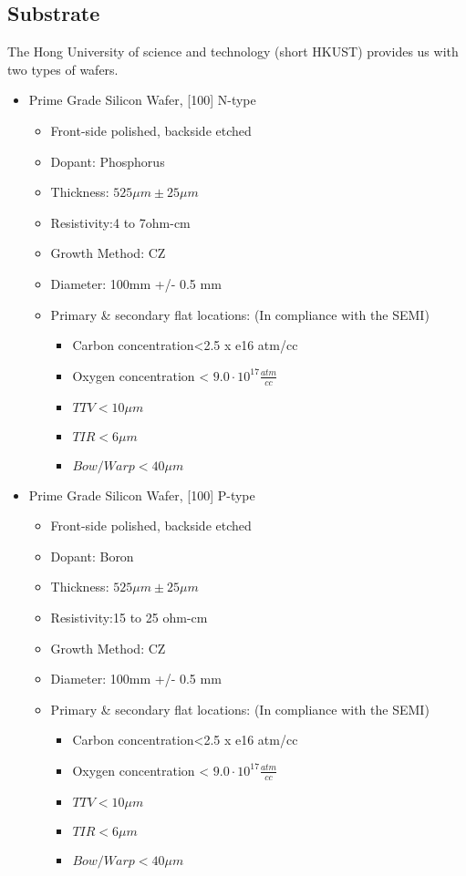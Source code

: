 \subsection{Substrate}

The Hong University of science and technology (short HKUST) provides us with two types of wafers.

\begin{itemize}
	\item Prime Grade Silicon Wafer, [100] N-type
	\begin{itemize}
		\item Front-side polished, backside etched
		\item Dopant: Phosphorus
		\item Thickness: $525 \mu m \pm 25 \mu m$
		\item Resistivity:4 to 7ohm-cm
		\item Growth Method: CZ
		\item Diameter: 100mm +/- 0.5 mm
		\item Primary  \& secondary flat locations: (In compliance with the SEMI)
			\begin{itemize}
				\item Carbon concentration<2.5 x e16 atm/cc
				\item Oxygen concentration < $9.0 \cdot 10^{17} \frac{atm}{cc}$
				\item $TTV < 10 \mu m$
				\item $TIR < 6 \mu m$
				\item $Bow/Warp < 40 \mu m$
			\end{itemize}
	\end{itemize}
	\item Prime Grade Silicon Wafer, [100] P-type
	\begin{itemize}
		\item Front-side polished, backside etched
		\item Dopant: Boron
		\item Thickness: $525 \mu m \pm 25 \mu m$
		\item Resistivity:15 to 25 ohm-cm
		\item Growth Method: CZ
		\item Diameter: 100mm +/- 0.5 mm
		\item Primary  \& secondary flat locations: (In compliance with the SEMI)
			\begin{itemize}
				\item Carbon concentration<2.5 x e16 atm/cc
				\item Oxygen concentration < $9.0 \cdot 10^{17} \frac{atm}{cc}$
				\item $TTV < 10 \mu m$
				\item $TIR < 6 \mu m$
				\item $Bow/Warp < 40 \mu m$
			\end{itemize}
	\end{itemize}
\end{itemize}

